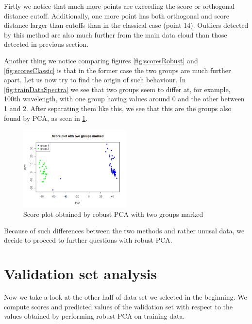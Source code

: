 \documentclass[12pt]{article}
\begin{document}
Firtly we notice that much more points are exceeding the score or orthogonal distance cutoff. 
Additionally, one more point has both orthogonal and score distance larger than cutoffs than in the classical case (point 14). Outliers detected by this method
are also much further from the main data cloud than those detected in previous section.

Another thing we notice comparing figures \ref{fig:scoresRobust} and \ref{fig:scoresClassic} is that in the former case the two groups are much further apart. Let us
now try to find the origin of such behaviour. In \ref{fig:trainDataSpectra} we see that two groups seem to differ at, for example, 100th wavelength, with one group having
values around 0 and the other between 1 and 2. After separating them like this, we see that this are the groups also found by PCA, as seen in \ref{fig:twoGroupScore}.

\begin{figure}
  \begin{center}
    \centering
      \includegraphics[width=0.5\textwidth]{../images/project1/twoGroupScore.png}
      \caption{Score plot obtained by robust PCA with two groups marked}
      \label{fig:twoGroupScore}
  \end{center}
\end{figure}

Because of such differences between the two methods and rather unusal data, we decide to proceed to further questions with robust PCA.

\section{Validation set analysis}
Now we take a look at the other half of data set we selected in the beginning. We compute scores and
predicted values of the validation set with respect to the values obtained by performing robust PCA on training data.
\end{document}
